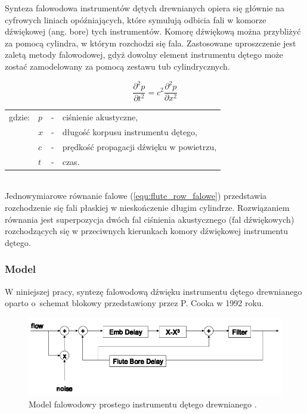 Synteza falowodowa instrumentów dętych drewnianych opiera się głównie na cyfrowych liniach opóźniających, które symulują odbicia fali w komorze dźwiękowej (ang. bore) tych instrumentów. Komorę dźwiękową można przybliżyć za pomocą cylindra, w którym rozchodzi się fala. Zastosowane uproszczenie jest zaletą metody falowodowej, gdyż dowolny element instrumentu dętego może zostać zamodelowany za pomocą zestawu tub cylindrycznych.

\begin{equation} \label{equ:flute_row_falowe}
\frac{\partial^2 p}{\partial t^2} = c^{2}\frac{\partial^2 p}{\partial x^2}
\end{equation}
\begin{tabular}{ l l l l}
	gdzie: 	&	$p$ & - &  ciśnienie akustyczne, \\
	&	$x$ & - &  długość korpusu instrumentu dętego,\\
	&	$c$ & - &  prędkość propagacji dźwięku w powietrzu,\\
	&	$t$ & - &  czas. \\
\end{tabular} \\

Jednowymiarowe równanie falowe (\ref{equ:flute_row_falowe}) przedstawia rozchodzenie się fali płaskiej w nieskończenie długim cylindrze. Rozwiązaniem równania jest superpozycja dwóch fal ciśnienia akustycznego (fal dźwiękowych) rozchodzących się w przeciwnych kierunkach komory dźwiękowej instrumentu dętego.


\subsubsection{Model}
W niniejszej pracy, syntezę falowodową dźwięku instrumentu dętego drewnianego oparto o~schemat blokowy przedstawiony przez P. Cooka w 1992 roku.

\begin{figure}[H]
	\centering
	\includegraphics[width=14cm]{grafiki/flute_waveguide_mod}
	\captionsetup{justification=centering}
	\caption{Model falowodowy prostego instrumentu dętego drewnianego \cite{flute_prezka}.}
	\label{rys:flute_cook}
\end{figure}

